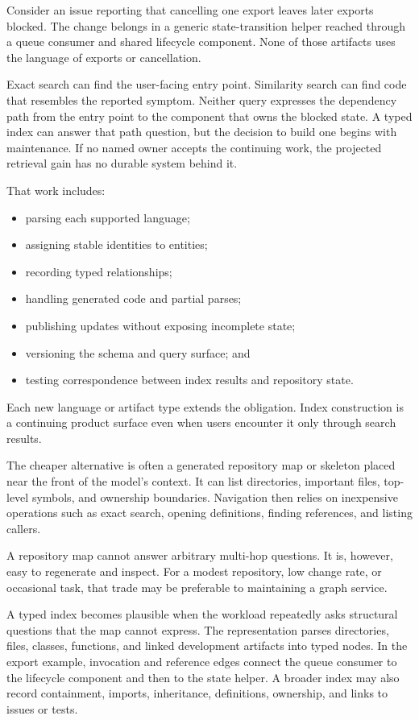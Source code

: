 Consider an issue reporting that cancelling one export leaves later exports blocked. The change belongs in a generic state-transition helper reached through a queue consumer and shared lifecycle component. None of those artifacts uses the language of exports or cancellation.

Exact search can find the user-facing entry point. Similarity search can find code that resembles the reported symptom. Neither query expresses the dependency path from the entry point to the component that owns the blocked state. A typed index can answer that path question, but the decision to build one begins with maintenance. If no named owner accepts the continuing work, the projected retrieval gain has no durable system behind it.

That work includes:

\begin{itemize}
\tightlist
\item
  parsing each supported language;
\item
  assigning stable identities to entities;
\item
  recording typed relationships;
\item
  handling generated code and partial parses;
\item
  publishing updates without exposing incomplete state;
\item
  versioning the schema and query surface; and
\item
  testing correspondence between index results and repository state.
\end{itemize}

Each new language or artifact type extends the obligation. Index construction is a continuing product surface even when users encounter it only through search results.

The cheaper alternative is often a generated repository map or skeleton placed near the front of the model's context. It can list directories, important files, top-level symbols, and ownership boundaries. Navigation then relies on inexpensive operations such as exact search, opening definitions, finding references, and listing callers.

A repository map cannot answer arbitrary multi-hop questions. It is, however, easy to regenerate and inspect. For a modest repository, low change rate, or occasional task, that trade may be preferable to maintaining a graph service.

A typed index becomes plausible when the workload repeatedly asks structural questions that the map cannot express. The representation parses directories, files, classes, functions, and linked development artifacts into typed nodes. In the export example, invocation and reference edges connect the queue consumer to the lifecycle component and then to the state helper. A broader index may also record containment, imports, inheritance, definitions, ownership, and links to issues or tests.

